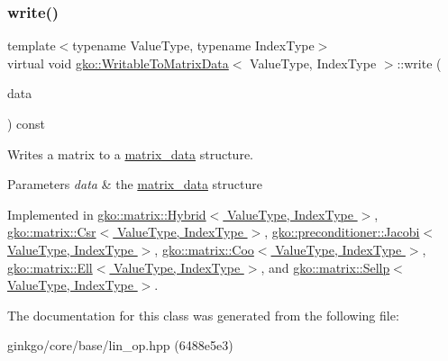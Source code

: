 \subsubsection{\texorpdfstring{write()}{write()}}
{\footnotesize\ttfamily template$<$typename Value\+Type, typename Index\+Type$>$ \\
virtual void \hyperlink{classgko_1_1WritableToMatrixData}{gko\+::\+Writable\+To\+Matrix\+Data}$<$ Value\+Type, Index\+Type $>$\+::write (\begin{DoxyParamCaption}\item[{\hyperlink{structgko_1_1matrix__data}{matrix\+\_\+data}$<$ Value\+Type, Index\+Type $>$ \&}]{data }\end{DoxyParamCaption}) const\hspace{0.3cm}{\ttfamily [pure virtual]}}



Writes a matrix to a \hyperlink{structgko_1_1matrix__data}{matrix\+\_\+data} structure. 


\begin{DoxyParams}{Parameters}
{\em data} & the \hyperlink{structgko_1_1matrix__data}{matrix\+\_\+data} structure \\
\hline
\end{DoxyParams}


Implemented in \hyperlink{classgko_1_1matrix_1_1Hybrid_a626c07541641bcdfd9a7f61322a89cbe}{gko\+::matrix\+::\+Hybrid$<$ Value\+Type, Index\+Type $>$}, \hyperlink{classgko_1_1matrix_1_1Csr_a205fc391f4cf4f7718a55b0a61f62bc9}{gko\+::matrix\+::\+Csr$<$ Value\+Type, Index\+Type $>$}, \hyperlink{classgko_1_1preconditioner_1_1Jacobi_ac52bb1c70d4882876da1ee21c3b124ee}{gko\+::preconditioner\+::\+Jacobi$<$ Value\+Type, Index\+Type $>$}, \hyperlink{classgko_1_1matrix_1_1Coo_ae193466ca1a4a3c7d1383ddc5a2701ab}{gko\+::matrix\+::\+Coo$<$ Value\+Type, Index\+Type $>$}, \hyperlink{classgko_1_1matrix_1_1Ell_afa9148a16a9255003055d8e9156ee941}{gko\+::matrix\+::\+Ell$<$ Value\+Type, Index\+Type $>$}, and \hyperlink{classgko_1_1matrix_1_1Sellp_aae2355a2866318b154d017b1c51f30a5}{gko\+::matrix\+::\+Sellp$<$ Value\+Type, Index\+Type $>$}.



The documentation for this class was generated from the following file\+:\begin{DoxyCompactItemize}
\item 
ginkgo/core/base/lin\+\_\+op.\+hpp (6488e5e3)\end{DoxyCompactItemize}
